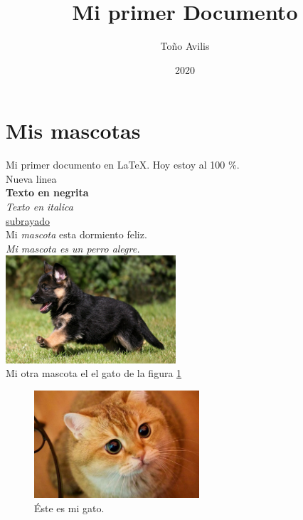 \documentclass[11pt, letterpaper]{article}
\title{Mi primer Documento}
\author{Toño Avilis}
\date{2020}
\begin{document}
\maketitle %

\tableofcontents %
 
\pagebreak %

\section{Mis mascotas} %

Mi primer documento en \LaTeX{}. Hoy estoy al 100 \%. \\
Nueva linea \\
\textbf{Texto en negrita} \\
\textit{Texto en italica} \\
\underline{subrayado}\\
Mi \emph{mascota} esta dormiento feliz.\\
\textit{Mi mascota es un \emph{perro} alegre.}\\

\includegraphics[height=4cm]{mascota.png}\\

Mi otra mascota el el gato de la figura \ref{fig:gato}

\begin{figure}[h] %
    \centering
    \includegraphics[height=4cm]{gato.jpg}
    \caption{Éste es mi gato.}
    \label{fig:gato}
\end{figure}
\end{document}
